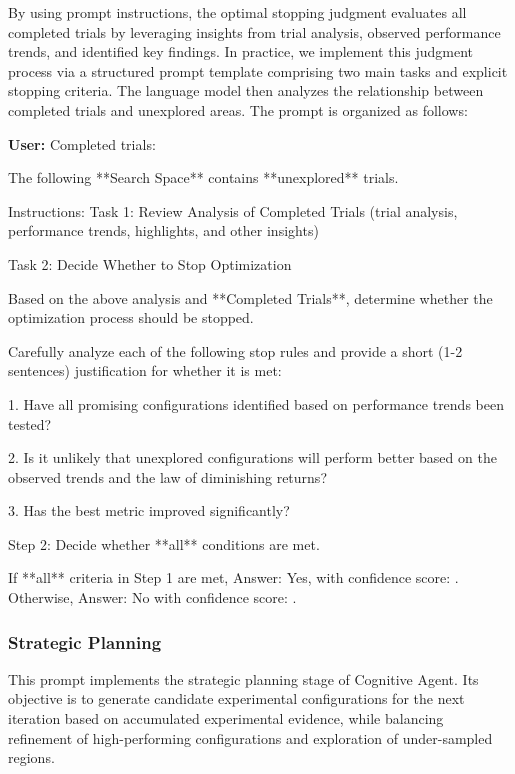 By using prompt instructions, the optimal stopping judgment evaluates all completed trials by leveraging insights from trial analysis, observed performance trends, and identified key findings. In practice, we implement this judgment process via a structured prompt template comprising two main tasks and explicit stopping criteria. The language model then analyzes the relationship between completed trials and unexplored areas. The prompt is organized as follows:


\begin{tcolorbox}[breakable,colback=orange!5!white, colframe=black, title={Cognitive Prompt for Best Stopping Judgement}]

\textbf{User:}
Completed trials:
    
    
The following **Search Space** contains **unexplored** trials.

Instructions:
Task 1: Review Analysis of Completed Trials (trial analysis, performance trends, highlights, and other insights)

Task 2: Decide Whether to Stop Optimization

Based on the above analysis and **Completed Trials**, determine whether the optimization process should be stopped.

Carefully analyze each of the following stop rules and provide a short (1-2 sentences) justification for whether it is met:

1. Have all promising configurations identified based on performance trends been tested?

2. Is it unlikely that unexplored configurations will perform better based on the observed trends and the law of diminishing returns?

3. Has the best metric improved significantly?

Step 2: Decide whether **all** conditions are met.

If **all** criteria in Step 1 are met, Answer: Yes, with confidence score: . Otherwise, Answer: No with confidence score: .
\end{tcolorbox}


\subsubsection{Strategic Planning}
\label{sec:supp_planning}
This prompt implements the strategic planning stage of Cognitive Agent. Its objective is to generate candidate experimental configurations for the next iteration based on accumulated experimental evidence, while balancing refinement of high-performing configurations and exploration of under-sampled regions.


